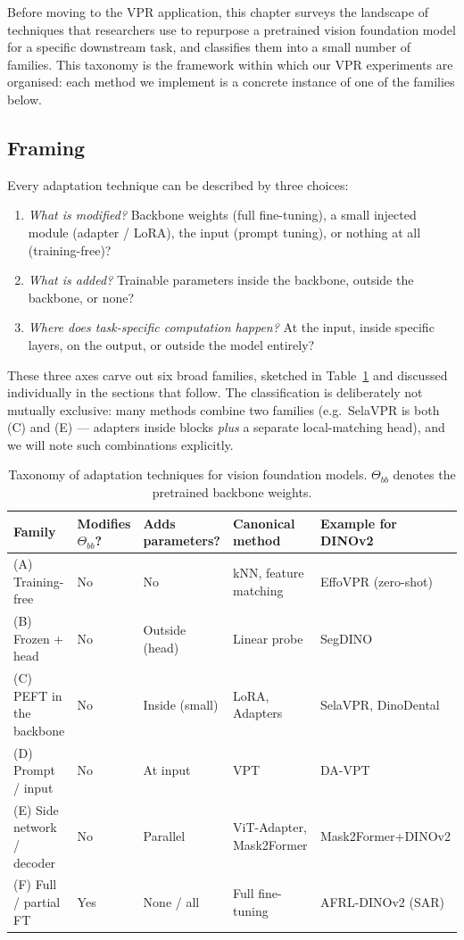 \documentclass[11pt,a4paper]{article}
\begin{document}
Before moving to the VPR application, this chapter surveys the landscape of
techniques that researchers use to repurpose a pretrained vision foundation
model for a specific downstream task, and classifies them into a small
number of families. This taxonomy is the framework within which our VPR
experiments are organised: each method we implement is a
concrete instance of one of the families below.

\subsection{Framing}

Every adaptation technique can be described by three choices:
\begin{enumerate}[leftmargin=*]
  \item \emph{What is modified?} Backbone weights (full fine-tuning),
  a small injected module (adapter / LoRA), the input (prompt tuning),
  or nothing at all (training-free)?
  \item \emph{What is added?} Trainable parameters inside the backbone,
  outside the backbone, or none?
  \item \emph{Where does task-specific computation happen?} At the input,
  inside specific layers, on the output, or outside the model entirely?
\end{enumerate}

These three axes carve out six broad families, sketched in
Table~\ref{tab:adapt-families} and discussed individually in the
sections that follow. The classification is deliberately not
mutually exclusive: many methods combine two families
(e.g.\ SelaVPR is both (C) and (E) --- adapters inside blocks
\emph{plus} a separate local-matching head), and we will note such
combinations explicitly.

\begin{table}[H]
\centering\small
\caption{Taxonomy of adaptation techniques for vision foundation
models. $\Theta_{bb}$ denotes the pretrained backbone weights.}
\label{tab:adapt-families}
\begin{tabular}{@{}lllll@{}}
\toprule
\textbf{Family} & \textbf{Modifies $\Theta_{bb}$?} & \textbf{Adds parameters?}
  & \textbf{Canonical method} & \textbf{Example for DINOv2} \\
\midrule
(A) Training-free         & No  & No                    & kNN, feature matching   & EffoVPR (zero-shot) \\
(B) Frozen + head         & No  & Outside (head)        & Linear probe             & SegDINO \\
(C) PEFT in the backbone  & No  & Inside (small)        & LoRA, Adapters          & SelaVPR, DinoDental \\
(D) Prompt / input        & No  & At input              & VPT                     & DA-VPT \\
(E) Side network / decoder& No  & Parallel              & ViT-Adapter, Mask2Former& Mask2Former+DINOv2 \\
(F) Full / partial FT     & Yes & None / all            & Full fine-tuning        & AFRL-DINOv2 (SAR)   \\
\bottomrule
\end{tabular}
\end{table}
\end{document}
